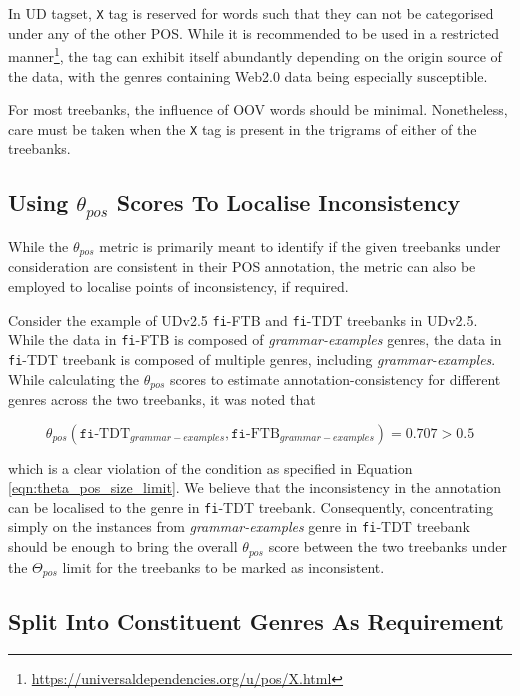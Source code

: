 In UD tagset, \verb|X| tag is reserved for words such that they can not be categorised under any of the other POS. While it is recommended to be used in a restricted manner\footnote{\url{https://universaldependencies.org/u/pos/X.html}}, the tag can exhibit itself abundantly depending on the origin source of the data, with the genres containing Web2.0 data being especially susceptible.

For most treebanks, the influence of OOV words should be minimal. Nonetheless, care must be taken when the \verb|X| tag is present in the trigrams of either of the treebanks.

\subsection{Using \texorpdfstring{$\theta_{pos}$}{theta\_pos} Scores To Localise Inconsistency}

While the $\theta_{pos}$ metric is primarily meant to identify if the given treebanks under consideration are consistent in their POS annotation, the metric can also be employed to localise points of inconsistency, if required.

Consider the example of UDv2.5 \texttt{fi}-FTB and \texttt{fi}-TDT treebanks in UDv2.5. While the data in \texttt{fi}-FTB is composed of \textit{grammar-examples} genres, the data in \texttt{fi}-TDT treebank is composed of multiple genres, including \textit{grammar-examples}. While calculating the $\theta_{pos}$ scores to estimate annotation-consistency for different genres across the two treebanks, it was noted that 

\begin{equation*}
    \theta_{pos}(\texttt{fi}\text{-TDT}_{grammar-examples}, \texttt{fi}\text{-FTB}_{grammar-examples}) = 0.707 > 0.5
\end{equation*}

which is a clear violation of the condition as specified in Equation \ref{eqn:theta_pos_size_limit}. We believe that the inconsistency in the annotation can be localised to the genre in \texttt{fi}-TDT treebank. Consequently, concentrating simply on the instances from \textit{grammar-examples} genre in \texttt{fi}-TDT treebank should be enough to bring the overall $\theta_{pos}$ score between the two treebanks under the $\Theta_{pos}$ limit for the treebanks to be marked as inconsistent.

\subsection{Split Into Constituent Genres As Requirement}

